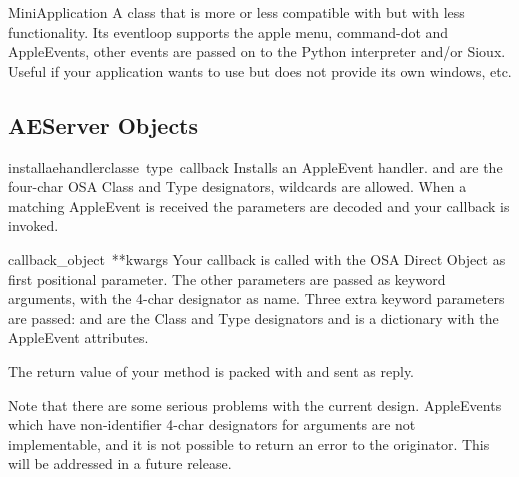 \begin{funcdesc}{MiniApplication}{}
A class that is more or less compatible with
 but with less functionality. Its
eventloop supports the apple menu, command-dot and AppleEvents, other
events are passed on to the Python interpreter and/or Sioux.
Useful if your application wants to use  but does not
provide its own windows, etc.
\end{funcdesc}

\subsection{AEServer Objects}

\renewcommand{\indexsubitem}{(AEServer method)}

\begin{funcdesc}{installaehandler}{classe\, type\, callback}
Installs an AppleEvent handler.  and  are the
four-char OSA Class and Type designators,  wildcards are
allowed. When a matching AppleEvent is received the parameters are
decoded and your callback is invoked.
\end{funcdesc}

\begin{funcdesc}{callback}{_object\, **kwargs}
Your callback is called with the OSA Direct Object as first positional
parameter. The other parameters are passed as keyword arguments, with
the 4-char designator as name. Three extra keyword parameters are
passed:  and  are the Class and Type
designators and  is a dictionary with the AppleEvent
attributes.

The return value of your method is packed with
 and sent as reply.
\end{funcdesc}

Note that there are some serious problems with the current
design. AppleEvents which have non-identifier 4-char designators for
arguments are not implementable, and it is not possible to return an
error to the originator. This will be addressed in a future release.
